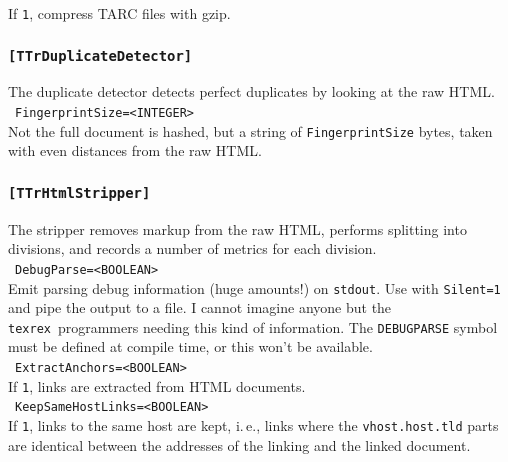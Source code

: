 \documentclass[12pt,a4paper]{article}
\newcommand{\trthis}{\texttt{texrex}}
\begin{document}
If \texttt{1}, compress TARC files with gzip.\\


\subsubsection{\texttt{[TTrDuplicateDetector]}}
\label{sec:duplicatedetector}

The duplicate detector detects perfect duplicates by looking at the raw HTML.\\

\noindent\textbullet~\texttt{FingerprintSize=<INTEGER>}\\

Not the full document is hashed, but a string of \texttt{FingerprintSize} bytes, taken with even distances from the raw HTML.\\


\subsubsection{\texttt{[TTrHtmlStripper]}}
\label{sec:htmlstripper}

The stripper removes markup from the raw HTML, performs splitting into divisions, and records a number of metrics for each division.\\

\noindent\textbullet~\texttt{DebugParse=<BOOLEAN>}\\

Emit parsing debug information (huge amounts!) on \texttt{stdout}.
Use with \texttt{Silent=1} and pipe the output to a file.
I cannot imagine anyone but the \trthis\ programmers needing this kind of information.
The \texttt{DEBUGPARSE} symbol must be defined at compile time, or this won't be available.\\

\noindent\textbullet~\texttt{ExtractAnchors=<BOOLEAN>}\\

If \texttt{1}, links are extracted from HTML documents.\\

\noindent\textbullet~\texttt{KeepSameHostLinks=<BOOLEAN>}\\

If \texttt{1}, links to the same host are kept, i.\,e., links where the \texttt{vhost.host.tld} parts are identical between the addresses of the linking and the  linked document.\\
\end{document}
